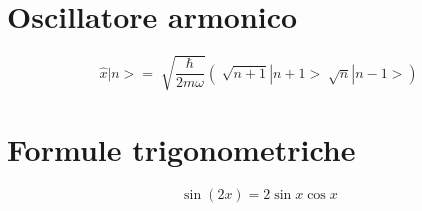 \section{Oscillatore armonico}
\begin{equation*}
    \hat{x}|n> = \sqrt[]{\frac{\hslash}{2m\omega}} (\sqrt[]{n+1}|n+1> \sqrt[]{n}|n-1>)
\end{equation*}

\section{Formule trigonometriche}

\begin{equation*}
    \sin (2x) = 2 \sin x \cos x
\end{equation*}

